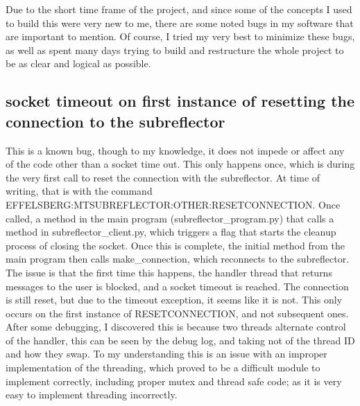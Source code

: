 \documentclass{article}
\begin{document}
Due to the short time frame of the project, and since some of the concepts I used to build this were very new to me, there are some noted bugs in my software that are important to mention. Of course, I tried my very best to minimize these bugs, as well as spent many days trying to build and restructure the whole project to be as clear and logical as possible.  

\subsection{socket timeout on first instance of resetting the connection to the subreflector }

This is a known bug, though to my knowledge, it does not impede or affect any of the code other than a socket time out. This only happens once, which is during the very first call to reset the connection with the subreflector. At time of writing, that is with the command EFFELSBERG:MTSUBREFLECTOR:OTHER:RESETCONNECTION. Once called, a method in the main program (subreflector\_program.py) that 
calls a method in subreflector\_client.py, which triggers a flag that starts the cleanup process of closing the socket. Once this is complete, the initial method from the main program then calls make\_connection, which reconnects to the subreflector. The issue is that the first time this happens, the handler thread that returns messages to the user is blocked, and a socket timeout is reached. The connection is still reset, but due to the timeout exception, it seems like it is not. This only occurs on the first instance of RESETCONNECTION, and not subsequent ones. After some debugging, I discovered this is because two threads alternate control of the handler, this can be seen by the debug log, and taking not of the thread ID and how they swap. To my understanding this is an issue with an improper implementation of the threading, which proved to be a difficult module to implement correctly, including proper mutex and thread safe code; as it is very easy to implement threading incorrectly.
\end{document}
